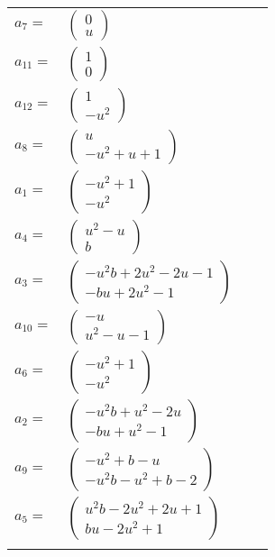 \documentclass[1p]{elsarticle_modified}
\theoremstyle{definition}
\begin{document}
\begin{tabular}{m{7pt} m{180pt} m{7pt} m{180pt} }
\flushright $a_{7}=$&$\begin{pmatrix}0\\u\end{pmatrix}$ \\
\flushright $a_{11}=$&$\begin{pmatrix}1\\0\end{pmatrix}$ \\
\flushright $a_{12}=$&$\begin{pmatrix}1\\- u^2\end{pmatrix}$ \\
\flushright $a_{8}=$&$\begin{pmatrix}u\\- u^2+u+1\end{pmatrix}$ \\
\flushright $a_{1}=$&$\begin{pmatrix}- u^2+1\\- u^2\end{pmatrix}$ \\
\flushright $a_{4}=$&$\begin{pmatrix}u^2- u\\b\end{pmatrix}$ \\
\flushright $a_{3}=$&$\begin{pmatrix}- u^2 b+2 u^2-2 u-1\\- b u+2 u^2-1\end{pmatrix}$ \\
\flushright $a_{10}=$&$\begin{pmatrix}- u\\u^2- u-1\end{pmatrix}$ \\
\flushright $a_{6}=$&$\begin{pmatrix}- u^2+1\\- u^2\end{pmatrix}$ \\
\flushright $a_{2}=$&$\begin{pmatrix}- u^2 b+u^2-2 u\\- b u+u^2-1\end{pmatrix}$ \\
\flushright $a_{9}=$&$\begin{pmatrix}- u^2+b- u\\- u^2 b- u^2+b-2\end{pmatrix}$ \\
\flushright $a_{5}=$&$\begin{pmatrix}u^2 b-2 u^2+2 u+1\\b u-2 u^2+1\end{pmatrix}$\\&\end{tabular}
\end{document}
